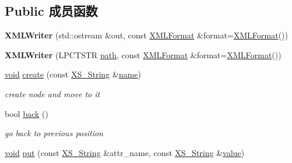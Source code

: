 \subsection*{Public 成员函数}
\begin{DoxyCompactItemize}
\item 
\mbox{\label{struct_x_m_l_storage_1_1_x_m_l_writer_a55ccf4a7c28edb4c1aaa7db9eb68691a}} 
{\bfseries X\+M\+L\+Writer} (std\+::ostream \&out, const \hyperlink{struct_x_m_l_storage_1_1_x_m_l_format}{X\+M\+L\+Format} \&format=\hyperlink{struct_x_m_l_storage_1_1_x_m_l_format}{X\+M\+L\+Format}())
\item 
\mbox{\label{struct_x_m_l_storage_1_1_x_m_l_writer_a4114551501a5aa97a17e26314b45a42e}} 
{\bfseries X\+M\+L\+Writer} (L\+P\+C\+T\+S\+TR \hyperlink{structpath}{path}, const \hyperlink{struct_x_m_l_storage_1_1_x_m_l_format}{X\+M\+L\+Format} \&format=\hyperlink{struct_x_m_l_storage_1_1_x_m_l_format}{X\+M\+L\+Format}())
\item 
\mbox{\label{struct_x_m_l_storage_1_1_x_m_l_writer_ad3ec198a0329a4cdb4f085d4d0bf9a63}} 
\hyperlink{interfacevoid}{void} \hyperlink{struct_x_m_l_storage_1_1_x_m_l_writer_ad3ec198a0329a4cdb4f085d4d0bf9a63}{create} (const \hyperlink{struct_x_m_l_storage_1_1_x_s___string}{X\+S\+\_\+\+String} \&\hyperlink{structname}{name})
\begin{DoxyCompactList}\small\item\em create node and move to it \end{DoxyCompactList}\item 
\mbox{\label{struct_x_m_l_storage_1_1_x_m_l_writer_abf84ed65bba1d76d76dc424697983ab9}} 
bool \hyperlink{struct_x_m_l_storage_1_1_x_m_l_writer_abf84ed65bba1d76d76dc424697983ab9}{back} ()
\begin{DoxyCompactList}\small\item\em go back to previous position \end{DoxyCompactList}\item 
\mbox{\label{struct_x_m_l_storage_1_1_x_m_l_writer_a200e8f15812088b24e63380c56f65443}} 
\hyperlink{interfacevoid}{void} \hyperlink{struct_x_m_l_storage_1_1_x_m_l_writer_a200e8f15812088b24e63380c56f65443}{put} (const \hyperlink{struct_x_m_l_storage_1_1_x_s___string}{X\+S\+\_\+\+String} \&attr\+\_\+name, const \hyperlink{struct_x_m_l_storage_1_1_x_s___string}{X\+S\+\_\+\+String} \&\hyperlink{unionvalue}{value})

\end{DoxyCompactItemize}
